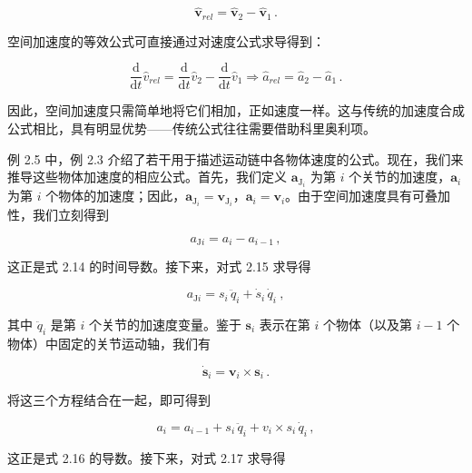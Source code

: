 \documentclass[10pt,a4paper]{book}
\theoremstyle{thmstyle} %
\theoremstyle{defstyle} %
\theoremstyle{prostyle} %
\begin{document}
$$
\hat { \mathbf { v } } _ { r e l } = \hat { \mathbf { v } } _ { 2 } - \hat { \mathbf { v } } _ { 1 } \, .
$$



空间加速度的等效公式可直接通过对速度公式求导得到：



$$
\frac { \mathrm { d } } { \mathrm { d } t } \hat { v } _ { r e l } = \frac { \mathrm { d } } { \mathrm { d } t } \hat { v } _ { 2 } - \frac { \mathrm { d } } { \mathrm { d } t } \hat { v } _ { 1 }  \Rightarrow  \hat { a } _ { r e l } = \hat { a } _ { 2 } - \hat { a } _ { 1 } \, .
$$



因此，空间加速度只需简单地将它们相加，正如速度一样。这与传统的加速度合成公式相比，具有明显优势——传统公式往往需要借助科里奥利项。



例 2.5 中，例 2.3 介绍了若干用于描述运动链中各物体速度的公式。现在，我们来推导这些物体加速度的相应公式。首先，我们定义 $\mathbf{a}_{\mathrm{J}_{i}}$ 为第 $i$ 个关节的加速度，$\mathbf{a}_{i}$ 为第 $i$ 个物体的加速度；因此，$\mathbf{a}_{\mathrm{J}_{i}}=\mathbf{v}_{\mathrm{J}_{i}}$，$\mathbf{a}_{i}=\mathbf{v}_{i}$。由于空间加速度具有可叠加性，我们立刻得到



$$
a _ { \mathrm { J } i } = a _ { i } - a _ { i - 1 } \, ,
$$



这正是式 2.14 的时间导数。接下来，对式 2.15 求导得



$$
a _ { \mathrm { J } i } = s _ { i } \, \ddot { q } _ { i } + \dot { s } _ { i } \, \dot { q } _ { i } \ ,
$$



其中 $\ddot{q}_{i}$ 是第 $i$ 个关节的加速度变量。鉴于 $\mathbf{s}_{i}$ 表示在第 $i$ 个物体（以及第 $i-1$ 个物体）中固定的关节运动轴，我们有



$$
\dot { \boldsymbol { s } } _ { i } = \boldsymbol { v } _ { i } \times \boldsymbol { s } _ { i } \, .
$$



将这三个方程结合在一起，即可得到



$$
a _ { i } = a _ { i - 1 } + s _ { i } \, \ddot { q } _ { i } + v _ { i } \times s _ { i } \, \dot { q } _ { i } \, ,
$$



这正是式 2.16 的导数。接下来，对式 2.17 求导得
\end{document}
